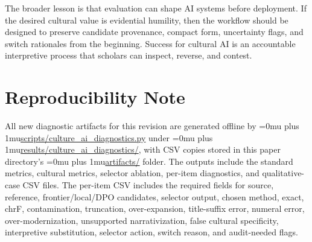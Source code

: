 \documentclass{article}
\newcommand{\pathcode}[1]{{\begingroup\Urlmuskip=0mu plus 1mu\url{#1}\endgroup}}
\begin{document}
The broader lesson is that evaluation can shape AI systems before deployment. If the desired cultural value is evidential humility, then the workflow should be designed to preserve candidate provenance, compact form, uncertainty flags, and switch rationales from the beginning. Success for cultural AI is an accountable interpretive process that scholars can inspect, reverse, and contest.

\section*{Reproducibility Note}

All new diagnostic artifacts for this revision are generated offline by \pathcode{scripts/culture_ai_diagnostics.py} under \pathcode{results/culture_ai_diagnostics/}, with CSV copies stored in this paper directory's \pathcode{artifacts/} folder. The outputs include the standard metrics, cultural metrics, selector ablation, per-item diagnostics, and qualitative-case CSV files. The per-item CSV includes the required fields for source, reference, frontier/local/DPO candidates, selector output, chosen method, exact, chrF, contamination, truncation, over-expansion, title-suffix error, numeral error, over-modernization, unsupported narrativization, false cultural specificity, interpretive substitution, selector action, switch reason, and audit-needed flags.
\end{document}
